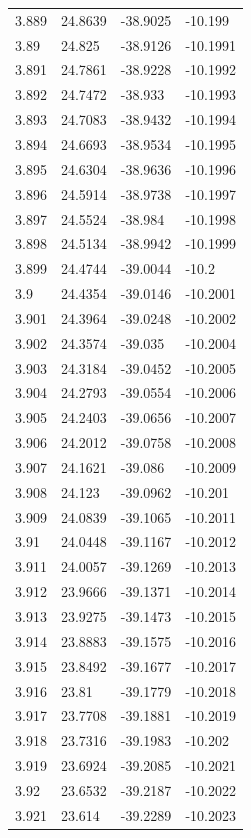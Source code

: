 \begin{tabular}{llll}
3.889 & 24.8639 & -38.9025 & -10.199 \\
3.89 & 24.825 & -38.9126 & -10.1991 \\
3.891 & 24.7861 & -38.9228 & -10.1992 \\
3.892 & 24.7472 & -38.933 & -10.1993 \\
3.893 & 24.7083 & -38.9432 & -10.1994 \\
3.894 & 24.6693 & -38.9534 & -10.1995 \\
3.895 & 24.6304 & -38.9636 & -10.1996 \\
3.896 & 24.5914 & -38.9738 & -10.1997 \\
3.897 & 24.5524 & -38.984 & -10.1998 \\
3.898 & 24.5134 & -38.9942 & -10.1999 \\
3.899 & 24.4744 & -39.0044 & -10.2 \\
3.9 & 24.4354 & -39.0146 & -10.2001 \\
3.901 & 24.3964 & -39.0248 & -10.2002 \\
3.902 & 24.3574 & -39.035 & -10.2004 \\
3.903 & 24.3184 & -39.0452 & -10.2005 \\
3.904 & 24.2793 & -39.0554 & -10.2006 \\
3.905 & 24.2403 & -39.0656 & -10.2007 \\
3.906 & 24.2012 & -39.0758 & -10.2008 \\
3.907 & 24.1621 & -39.086 & -10.2009 \\
3.908 & 24.123 & -39.0962 & -10.201 \\
3.909 & 24.0839 & -39.1065 & -10.2011 \\
3.91 & 24.0448 & -39.1167 & -10.2012 \\
3.911 & 24.0057 & -39.1269 & -10.2013 \\
3.912 & 23.9666 & -39.1371 & -10.2014 \\
3.913 & 23.9275 & -39.1473 & -10.2015 \\
3.914 & 23.8883 & -39.1575 & -10.2016 \\
3.915 & 23.8492 & -39.1677 & -10.2017 \\
3.916 & 23.81 & -39.1779 & -10.2018 \\
3.917 & 23.7708 & -39.1881 & -10.2019 \\
3.918 & 23.7316 & -39.1983 & -10.202 \\
3.919 & 23.6924 & -39.2085 & -10.2021 \\
3.92 & 23.6532 & -39.2187 & -10.2022 \\
3.921 & 23.614 & -39.2289 & -10.2023 \\

\end{tabular}

